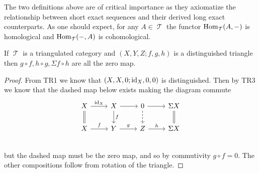 \documentclass[11pt]{article}
\DeclareMathOperator{\TT}{\mathcal{T}}
\begin{document}
The two definitions above are of critical importance as they axiomatize the relationship between short exact sequences and their derived long exact counterparts. As one should expect, for any $A \in \TT$ the functor $\Hom_{\TT}(A,-)$ is homological and $\Hom_{\TT}(-,A)$ is cohomological.

\begin{lem}
If $\TT$ is a triangulated category and $(X,Y,Z; f,g,h)$ is a distinguished triangle then $g\circ f,h\circ g,\Sigma f\circ h$ are all the zero map.
\end{lem}
\begin{proof}
From TR1 we know that $(X,X,0; \operatorname{id}_X, 0,0)$ is distinguished. Then by TR3 we know that the dashed map below exists making the diagram commute
\[\begin{tikzcd}
X \ar[r,"\id_X"] \ar[d, equal] & X \ar[r] \ar[d,"f"] & 0 \ar[d,dashed] \ar[r] & \Sigma X \ar[d,equal]\\
X \ar[r,"f"] & Y \ar[r,"g"] & Z \ar[r,"h"] & \Sigma X\\
\end{tikzcd}\]
but the dashed map must be the zero map, and so by commutivity $g\circ f= 0 $. The other compositions follow from rotation of the triangle.
\end{proof}
\end{document}
